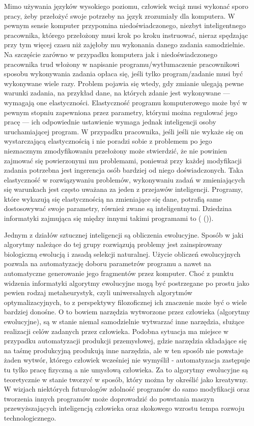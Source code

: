 Mimo używania języków wysokiego poziomu, człowiek wciąż musi wykonać sporo pracy, żeby przełożyć swoje potrzeby na język zrozumiały dla komputera. W pewnym sensie komputer przypomina niedoświadczonego, niezbyt inteligentnego pracownika, którego przełożony musi krok po kroku instruować, nieraz spędzając przy tym więcej czasu niż zajęłoby mu wykonania danego zadania samodzielnie. Na szczęście zarówno w przypadku komputera jak i niedoświadczonego pracownika trud włożony w napisanie programu/wytłumaczenie pracownikowi sposobu wykonywania zadania opłaca się, jeśli tylko program/zadanie musi być wykonywane wiele razy. Problem pojawia się wtedy, gdy zmianie ulegają pewne warunki zadania, na przykład dane, na których zdanie jest wykonywane --- wymagają one elastyczności. Elastyczność programu komputerowego może być w pewnym stopniu zapewniona przez parametry, którymi można regulować jego pracę --- ich odpowiednie ustawienie wymaga jednak inteligencji osoby uruchamiającej program. W przypadku pracownika, jeśli jeśli nie wykaże się on wystarczającą elastycznością i nie poradzi sobie z problemem po jego nieznacznym zmodyfikowaniu przełożony może stwierdzić, że nie powinien zajmować się powierzonymi mu problemami, ponieważ przy każdej modyfikacji zadania potrzebna jest ingerencja osób bardziej od niego doświadczonych. Taka elastyczność w rozwiązywaniu problemów, wykonywaniu zadań w zmieniających się warunkach jest często uważana za jeden z przejawów inteligencji. Programy, które wykazują się elastycznością na zmieniające się dane, potrafią same dostosowywać swoje parametry, również zwane są inteligentnymi. Dziedzina informatyki zajmująca się między innymi takimi programami to  ( ()).

Jednym z działów sztucznej inteligencji są obliczenia ewolucyjne. Sposób w jaki algorytmy należące do tej grupy rozwiązują problemy jest zainspirowany biologiczną ewolucją i zasadą selekcji naturalnej. Użycie obliczeń ewolucyjnych pozwala na automatyzację doboru parametrów programu a nawet na automatyczne generowanie jego fragmentów przez komputer. Choć z punktu widzenia informatyki algorytmy ewolucyjne mogą być postrzegane po prostu jako pewien rodzaj metaheurystyk, czyli uniwersalnych algorytmów optymalizacyjnych, to z perspektywy filozoficznej ich znaczenie może być o wiele bardziej donośne. O to bowiem narzędzia wytworzone przez człowieka (algorytmy ewolucyjne), są w stanie niemal samodzielnie wytwarzać inne narzędzia, służące realizacji celów zadanych przez człowieka. Podobna sytuacja ma miejsce w przypadku automatyzacji produkcji przemysłowej, gdzie narzędzia składające się na taśmę produkcyjną produkują inne narzędzia, ale w ten sposób nie powstaje  żaden wytwór, którego człowiek wcześniej nie wymyślił - automatyzacja zastępuje tu tylko pracę fizyczną a nie umysłową człowieka. Za to algorytmy ewolucyjne są teoretycznie w stanie tworzyć w sposób, który można by określić jako kreatywny. W wizjach niektórych futurologów zdolność programów do samo modyfikacji oraz tworzenia innych programów może doprowadzić do powstania maszyn przewyższających inteligencją człowieka oraz skokowego wzrostu tempa rozwoju technologicznego.

